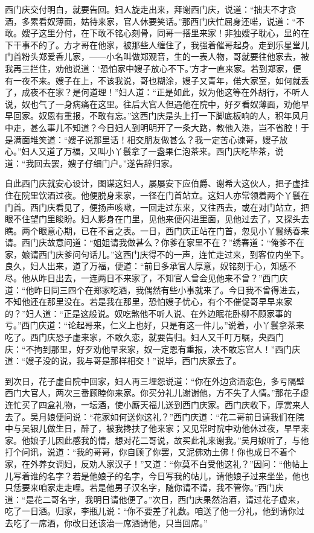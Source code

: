 西门庆交付明白，就要告回。妇人旋走出来，拜谢西门庆，说道：“拙夫不才贪酒，多累看奴薄面，姑待来家，官人休要笑话。”那西门庆忙屈身还喏，说道：“不敢。嫂子这里分付，在下敢不铭心刻骨，同哥一搭里来家！非独嫂子耽心，显的在下干事不的了。方才哥在他家，被那些人缠住了，我强着催哥起身。走到乐星堂儿门首粉头郑爱香儿家，——小名叫做郑观音，生的一表人物，哥就要往他家去，被我再三拦住，劝他说道：‘恐怕家中嫂子放心不下。’方才一直来家。若到郑家，便有一夜不来。嫂子在上，不该我说，哥也糊涂，嫂子又青年，偌大家室，如何就丢了，成夜不在家？是何道理！”妇人道：“正是如此，奴为他这等在外胡行，不听人说，奴也气了一身病痛在这里。往后大官人但遇他在院中，好歹看奴薄面，劝他早早回家。奴恩有重报，不敢有忘。”这西门庆是头上打一下脚底板响的人，积年风月中走，甚么事儿不知道？今日妇人到明明开了一条大路，教他入港，岂不省腔！于是满面堆笑道：“嫂子说那里话！相交朋友做甚么？我一定苦心谏哥，嫂子放心。”妇人又道了万福，又叫小丫鬟拿了一盏果仁泡茶来。西门庆吃毕茶，说道：“我回去罢，嫂子仔细门户。”遂告辞归家。

自此西门庆就安心设计，图谋这妇人，屡屡安下应伯爵、谢希大这伙人，把子虚挂住在院里饮酒过夜。他便脱身来家，一径在门首站立。这妇人亦常领着两个丫鬟在门首。西门庆看见了，便扬声咳嗽，一回走过东来，又往西去，或在对门站立，把眼不住望门里睃盼。妇人影身在门里，见他来便闪进里面，见他过去了，又探头去瞧。两个眼意心期，已在不言之表。一日，西门庆正站在门首，忽见小丫鬟绣春来请。西门庆故意问道：“姐姐请我做甚么？你爹在家里不在？”绣春道：“俺爹不在家，娘请西门庆爹问句话儿。”这西门庆得不的一声，连忙走过来，到客位内坐下。良久，妇人出来，道了万福，便道：“前日多承官人厚意，奴铭刻于心，知感不尽。他从昨日出去，一连两日不来家了，不知官人曾会见他来不曾？”西门庆道：“他昨日同三四个在郑家吃酒，我偶然有些小事就来了。今日我不曾得进去，不知他还在那里没在。若是我在那里，恐怕嫂子忧心，有个不催促哥早早来家的？”妇人道：“正是这般说。奴吃煞他不听人说、在外边眠花卧柳不顾家事的亏。”西门庆道：“论起哥来，仁义上也好，只是有这一件儿。”说着，小丫鬟拿茶来吃了。西门庆恐子虚来家，不敢久恋，就要告归。妇人又千叮万嘱，央西门庆：“不拘到那里，好歹劝他早来家，奴一定恩有重报，决不敢忘官人！”西门庆道：“嫂子没的说，我与哥是那样相交！”说毕，西门庆家去了。

到次日，花子虚自院中回家，妇人再三埋怨说道：“你在外边贪酒恋色，多亏隔壁西门大官人，两次三番顾睦你来家。你买分礼儿谢谢他，方不失了人情。”那花子虚连忙买了四盒礼物，一坛酒，使小厮天福儿送到西门庆家。西门庆收下，厚赏来人去了。吴月娘便问说：“花家如何送你这礼？”西门庆道：“花二哥前日请我们在院中与吴银儿做生日，醉了，被我搀扶了他来家；又见常时院中劝他休过夜，早早来家。他娘子儿因此感我的情，想对花二哥说，故买此礼来谢我。”吴月娘听了，与他打个问讯，说道：“我的哥哥，你自顾了你罢，又泥佛劝土佛！你也成日不着个家，在外养女调妇，反劝人家汉子！”又道：“你莫不白受他这礼？”因问：“他帖上儿写着谁的名字？若是他娘子的名字，今日写我的帖儿，请他娘子过来坐坐，他也只恁要来咱家走走哩。若是他男子汉名字，随你请不请，我不管你。”西门庆道：“是花二哥名字，我明日请他便了。”次日，西门庆果然治酒，请过花子虚来，吃了一日酒。归家，李瓶儿说：“你不要差了礼数。咱送了他一分礼，他到请你过去吃了一席酒，你改日还该治一席酒请他，只当回席。”

